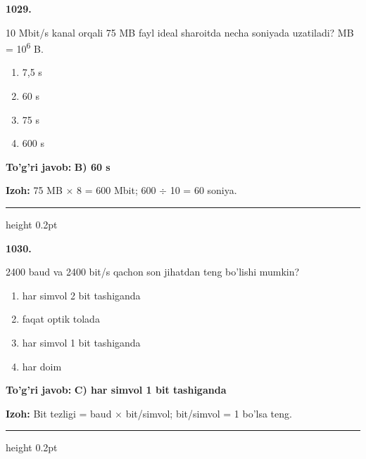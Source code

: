 \documentclass[10pt,a4paper,oneside]{article}
\begin{document}
\noindent\textbf{\color{ink}1029.}
\par
10 Mbit/s kanal orqali 75 MB fayl ideal sharoitda necha soniyada uzatiladi? MB = 10\textsuperscript{6} B.
\begin{enumerate}[label=\Alph*),leftmargin=9mm]
\item 7,5 s
\item 60 s
\item 75 s
\item 600 s
\end{enumerate}
\begin{tcolorbox}[enhanced,breakable,colback=teal!4,colframe=teal!50!black,boxrule=0.5pt,arc=1.1mm,left=3mm,right=3mm,top=1.7mm,bottom=1.7mm,before skip=2mm,after skip=2mm]
\textbf{\color{teal}To'g'ri javob:} \textbf{B) 60 s}
\par\smallskip
\textbf{Izoh:} 75 MB \ensuremath{\times} 8 = 600 Mbit; 600 \ensuremath{\div} 10 = 60 soniya.
\end{tcolorbox}
\vspace{2mm}\hrule height 0.2pt \vspace{3mm}

\noindent\textbf{\color{ink}1030.}
\par
2400 baud va 2400 bit/s qachon son jihatdan teng bo'lishi mumkin?
\begin{enumerate}[label=\Alph*),leftmargin=9mm]
\item har simvol 2 bit tashiganda
\item faqat optik tolada
\item har simvol 1 bit tashiganda
\item har doim
\end{enumerate}
\begin{tcolorbox}[enhanced,breakable,colback=teal!4,colframe=teal!50!black,boxrule=0.5pt,arc=1.1mm,left=3mm,right=3mm,top=1.7mm,bottom=1.7mm,before skip=2mm,after skip=2mm]
\textbf{\color{teal}To'g'ri javob:} \textbf{C) har simvol 1 bit tashiganda}
\par\smallskip
\textbf{Izoh:} Bit tezligi = baud \ensuremath{\times} bit/simvol; bit/simvol = 1 bo'lsa teng.
\end{tcolorbox}
\vspace{2mm}\hrule height 0.2pt \vspace{3mm}
\end{document}
